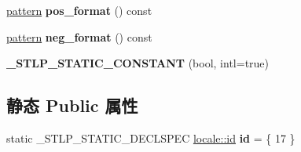 \begin{DoxyCompactItemize}
\item 
\mbox{\label{classmoneypunct_3_01wchar__t_00_01true_01_4_afb69e1b2350a4db4d217b264e313f50b}} 
\hyperlink{structmoney__base_1_1pattern}{pattern} {\bfseries pos\+\_\+format} () const
\item 
\mbox{\label{classmoneypunct_3_01wchar__t_00_01true_01_4_a7c2db5e50f2aa98dfcb9edb0560f7965}} 
\hyperlink{structmoney__base_1_1pattern}{pattern} {\bfseries neg\+\_\+format} () const
\item 
\mbox{\label{classmoneypunct_3_01wchar__t_00_01true_01_4_ad3a57df9e18502d816feabb66999213f}} 
{\bfseries \+\_\+\+S\+T\+L\+P\+\_\+\+S\+T\+A\+T\+I\+C\+\_\+\+C\+O\+N\+S\+T\+A\+NT} (bool, intl=true)
\end{DoxyCompactItemize}
\subsection*{静态 Public 属性}
\begin{DoxyCompactItemize}
\item 
\mbox{\label{classmoneypunct_3_01wchar__t_00_01true_01_4_a94cff7c53d9d0b4d738cc715bae5a94e}} 
static \+\_\+\+S\+T\+L\+P\+\_\+\+S\+T\+A\+T\+I\+C\+\_\+\+D\+E\+C\+L\+S\+P\+EC \hyperlink{classlocale_1_1id}{locale\+::id} {\bfseries id} = \{ 17 \}
\end{DoxyCompactItemize}
